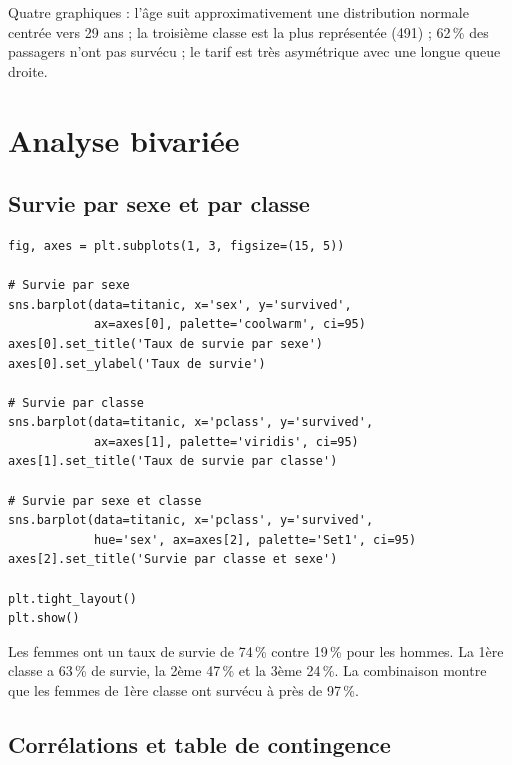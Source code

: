 \begin{codeoutput}
Quatre graphiques : l'\^age suit approximativement une distribution normale centr\'ee vers 29 ans ; la troisi\`eme classe est la plus repr\'esent\'ee (491) ; 62\,\% des passagers n'ont pas surv\'ecu ; le tarif est tr\`es asym\'etrique avec une longue queue droite.
\end{codeoutput}

\section{Analyse bivari\'ee}

\subsection{Survie par sexe et par classe}

\begin{codeblock}[title=\textbf{Python}]
\begin{verbatim}
fig, axes = plt.subplots(1, 3, figsize=(15, 5))

# Survie par sexe
sns.barplot(data=titanic, x='sex', y='survived',
            ax=axes[0], palette='coolwarm', ci=95)
axes[0].set_title('Taux de survie par sexe')
axes[0].set_ylabel('Taux de survie')

# Survie par classe
sns.barplot(data=titanic, x='pclass', y='survived',
            ax=axes[1], palette='viridis', ci=95)
axes[1].set_title('Taux de survie par classe')

# Survie par sexe et classe
sns.barplot(data=titanic, x='pclass', y='survived',
            hue='sex', ax=axes[2], palette='Set1', ci=95)
axes[2].set_title('Survie par classe et sexe')

plt.tight_layout()
plt.show()
\end{verbatim}
\end{codeblock}

\begin{codeoutput}
Les femmes ont un taux de survie de 74\,\% contre 19\,\% pour les hommes. La 1\`ere classe a 63\,\% de survie, la 2\`eme 47\,\% et la 3\`eme 24\,\%. La combinaison montre que les femmes de 1\`ere classe ont surv\'ecu \`a pr\`es de 97\,\%.
\end{codeoutput}

\subsection{Corr\'elations et table de contingence}

